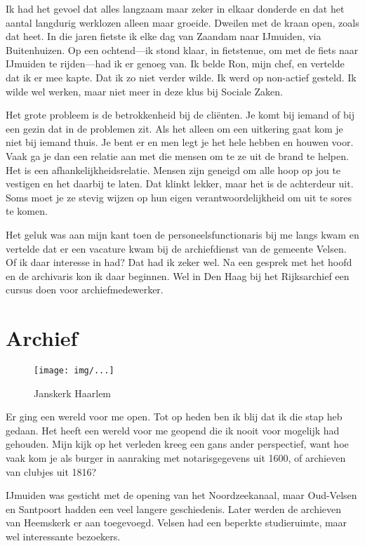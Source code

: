 \documentclass[10pt,twoside,openright]{memoir}
\begin{document}
Ik had het gevoel dat alles langzaam maar zeker in elkaar donderde en dat het aantal langdurig werklozen alleen maar groeide. Dweilen met de kraan open, zoals dat heet. In die jaren fietste ik elke dag van Zaandam naar IJmuiden, via Buitenhuizen. Op een ochtend---ik stond klaar, in fietstenue, om met de fiets naar IJmuiden te rijden---had ik er genoeg van. Ik belde Ron, mijn chef, en vertelde dat ik er mee kapte. Dat ik zo niet verder wilde. Ik werd op non-actief gesteld. Ik wilde wel werken, maar niet meer in deze klus bij Sociale Zaken.

Het grote probleem is de betrokkenheid bij de cliënten. Je komt bij iemand of bij een gezin dat in de problemen zit. Als het alleen om een uitkering gaat kom je niet bij iemand thuis. Je bent er en men legt je het hele hebben en houwen voor. Vaak ga je dan een relatie aan met die mensen om te ze uit de brand te helpen. Het is een afhankelijkheidsrelatie. Mensen zijn geneigd om alle hoop op jou te vestigen en het daarbij te laten. Dat klinkt lekker, maar het is de achterdeur uit. Soms moet je ze stevig wijzen op hun eigen verantwoordelijkheid om uit te sores te komen. 

Het geluk was aan mijn kant toen de personeelsfunctionaris bij me langs kwam en vertelde dat er een vacature kwam bij de archiefdienst van de gemeente Velsen. Of ik daar interesse in had? Dat had ik zeker wel. Na een gesprek met het hoofd en de archivaris kon ik daar beginnen. Wel in Den Haag bij het Rijksarchief een cursus doen voor archiefmedewerker. 

\chapter{Archief} %
\label{cha:archief}

\begin{figure}[t]
\texttt{[image: img/...]}
\caption{Janskerk Haarlem}
\end{figure}

Er ging een wereld voor me open. Tot op heden ben ik blij dat ik die stap heb gedaan. Het heeft een wereld voor me geopend die ik nooit voor mogelijk had gehouden. Mijn kijk op het verleden kreeg een gans ander perspectief, want hoe vaak kom je als burger in aanraking met notarisgegevens uit 1600, of archieven van clubjes uit 1816?

IJmuiden was gesticht met de opening van het Noordzeekanaal, maar Oud-Velsen en Santpoort hadden een veel langere geschiedenis. Later werden de archieven van Heemskerk er aan toegevoegd. Velsen had een beperkte studieruimte, maar wel interessante bezoekers. 
\end{document}
